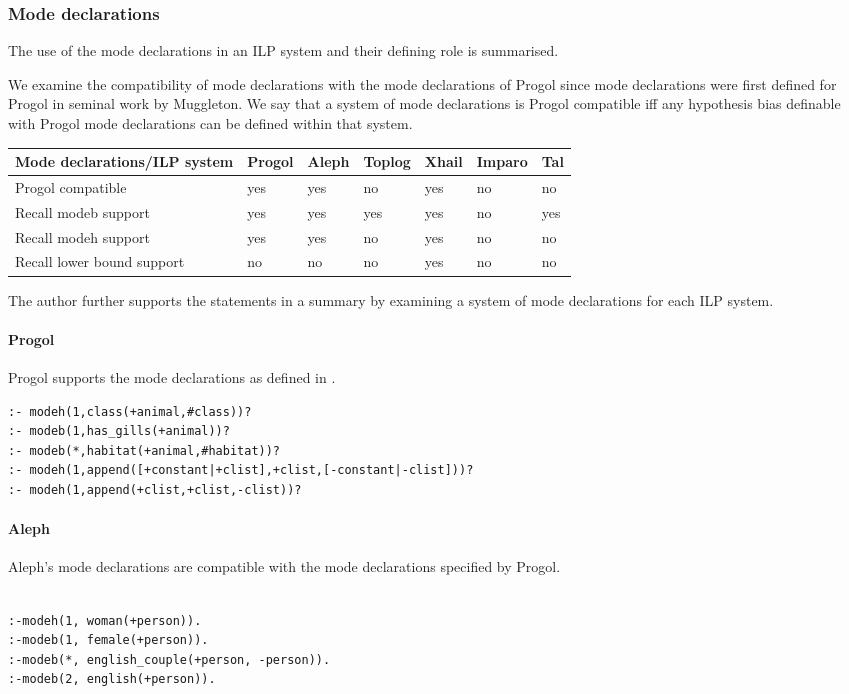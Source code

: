 \subsubsection{Mode declarations}
The use of the mode declarations in an ILP system and their defining role is summarised.

We examine the compatibility of mode declarations with the mode declarations of Progol since mode declarations were first defined for Progol in seminal work by Muggleton\cite{muggleton1995inverse}.
We say that a system of mode declarations is Progol compatible iff any hypothesis bias definable with Progol mode declarations can be defined within that system.

 \label{tab:classification_by_mode_declaration_bias} 
 \begin{tabular}{| l | l | l | l | l | l | l |}
    \hline
    Mode declarations/ILP system & Progol & Aleph & Toplog & Xhail & Imparo & Tal \\ \hline
    Progol compatible & yes & yes & no &  yes & no & no \\ \hline
    Recall modeb support & yes & yes & yes & yes & no & yes \\ \hline
    Recall modeh support & yes & yes & no & yes & no & no \\ \hline
    Recall lower bound support & no & no & no & yes & no & no \\ \hline
  \end{tabular}

The author further supports the statements in a summary by examining a system of mode declarations for each ILP system.

\paragraph{Progol}
Progol supports the mode declarations as defined in .

\begin{exmp}\cite{muggleton1999progolWebsite}
\begin{lstlisting}
:- modeh(1,class(+animal,#class))?
:- modeb(1,has_gills(+animal))?
:- modeb(*,habitat(+animal,#habitat))?
:- modeh(1,append([+constant|+clist],+clist,[-constant|-clist]))?
:- modeh(1,append(+clist,+clist,-clist))?
\end{lstlisting}
\end{exmp}

\paragraph{Aleph}
Aleph's mode declarations are compatible\cite{aleph2007} with the mode declarations specified by Progol.
\begin{exmp}
\begin{lstlisting}

:-modeh(1, woman(+person)).
:-modeb(1, female(+person)).
:-modeb(*, english_couple(+person, -person)).
:-modeb(2, english(+person)).
\end{lstlisting}
\end{exmp}

